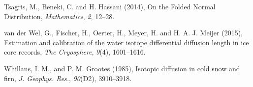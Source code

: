 \documentclass[draft, jgrga]{AGUTeX}
\begin{document}
\begin{article}
\begin{thebibliography}{}
Tsagris, M., Beneki, C. and H. Hassani (2014),
{On the Folded Normal Distribution},
\textit{Mathematics}, \textit{2}, 12--28.

van der Wel, G., Fischer, H., Oerter, H., Meyer, H. and H. A. J. Meijer (2015),
Estimation and calibration of the water isotope differential diffusion length in ice core records,
\textit{The Cryosphere}, \textit{9}(4), 1601--1616.

Whillans, I. M., and P. M. Grootes (1985),
Isotopic diffusion in cold snow and firn,
\textit{J. Geophys. Res.}, \textit{90}(D2), 3910--3918.


\end{thebibliography}





\end{article}

\end{document}
